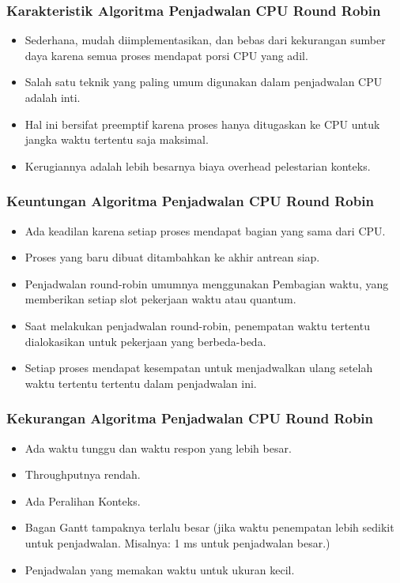 \documentclass[12pt]{article}
\begin{document}
		\subsubsection*{Karakteristik Algoritma Penjadwalan CPU Round Robin}
		\begin{itemize}
			\item Sederhana, mudah diimplementasikan, dan bebas dari kekurangan sumber daya karena semua proses mendapat porsi CPU yang adil.
			\item Salah satu teknik yang paling umum digunakan dalam penjadwalan CPU adalah inti.
			\item Hal ini bersifat preemptif karena proses hanya ditugaskan ke CPU untuk jangka waktu tertentu saja maksimal.
			\item Kerugiannya adalah lebih besarnya biaya overhead pelestarian konteks.
		\end{itemize}
		
		\subsubsection*{Keuntungan Algoritma Penjadwalan CPU Round Robin}
		\begin{itemize}
			\item Ada keadilan karena setiap proses mendapat bagian yang sama dari CPU.
			\item Proses yang baru dibuat ditambahkan ke akhir antrean siap.
			\item Penjadwalan round-robin umumnya menggunakan Pembagian waktu, yang memberikan setiap slot pekerjaan waktu atau quantum. 
			\item Saat melakukan penjadwalan round-robin, penempatan waktu tertentu dialokasikan untuk pekerjaan yang berbeda-beda. 
			\item Setiap proses mendapat kesempatan untuk menjadwalkan ulang setelah waktu tertentu tertentu dalam penjadwalan ini. 
		\end{itemize}
		
		\subsubsection*{Kekurangan Algoritma Penjadwalan CPU Round Robin}
		\begin{itemize}
			\item Ada waktu tunggu dan waktu respon yang lebih besar.
			\item Throughputnya rendah.
			\item Ada Peralihan Konteks.
			\item Bagan Gantt tampaknya terlalu besar (jika waktu penempatan lebih sedikit untuk penjadwalan. Misalnya: 1 ms untuk penjadwalan besar.)
			\item Penjadwalan yang memakan waktu untuk ukuran kecil.
		\end{itemize}
\end{document}
